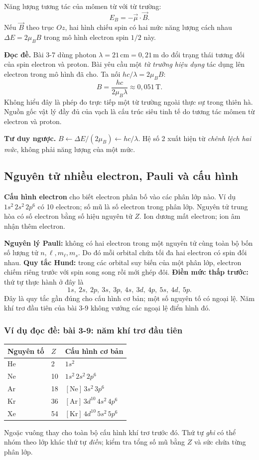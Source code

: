 \documentclass[11pt,a4paper]{article}
\newcommand{\unit}[1]{\,\mathrm{#1}}
\newcommand{\readit}[1]{\par\textbf{Đọc đề.} #1\par}
\newcommand{\think}[1]{\par\textbf{Tư duy ngược.} #1\par}
\newcommand{\ex}[1]{\subsubsection*{Ví dụ đọc đề: #1}}
\begin{document}
Năng lượng tương tác của mômen từ với từ trường:
\[
E_B=-\vec\mu\cdot\vec B.
\]
Nếu $\vec B$ theo trục $Oz$, hai hình chiếu spin có hai mức năng lượng
cách nhau $\Delta E=2\mu_BB$ trong mô hình electron spin $1/2$ này.

\readit{Bài 3-7 dùng photon $\lambda=21\unit{cm}=0{,}21\unit m$
do đổi trạng thái tương đối của spin electron và proton.
Bài yêu cầu một \emph{từ trường hiệu dụng} tác dụng lên electron trong
mô hình đã cho. Ta nối $hc/\lambda=2\mu_BB$:
\[
B=\frac{hc}{2\mu_B\lambda}\approx0{,}051\unit T.
\]
Không hiểu đây là phép đo trực tiếp một từ trường ngoài thực sự trong thiên hà.
Nguồn gốc vật lý đầy đủ của vạch là cấu trúc siêu tinh tế do tương tác
mômen từ electron và proton.}

\think{$B\leftarrow\Delta E/(2\mu_B)\leftarrow hc/\lambda$.
Hệ số 2 xuất hiện từ \emph{chênh lệch hai mức}, không phải năng lượng của một mức.}

\subsection{Nguyên tử nhiều electron, Pauli và cấu hình}\label{sec:configuration}
\textbf{Cấu hình electron} cho biết electron phân bố vào các phân lớp nào.
Ví dụ $1s^2\,2s^2\,2p^6$ có 10 electron; số mũ là số electron trong phân lớp.
Nguyên tử trung hòa có số electron bằng số hiệu nguyên tử $Z$.
Ion dương mất electron; ion âm nhận thêm electron.

\textbf{Nguyên lý Pauli:} không có hai electron trong một nguyên tử cùng
toàn bộ bốn số lượng tử $n,\ell,m_\ell,m_s$.
Do đó mỗi orbital chứa tối đa hai electron có spin đối nhau.
\textbf{Quy tắc Hund:} trong các orbital suy biến của một phân lớp,
electron chiếm riêng trước với spin song song rồi mới ghép đôi.
\textbf{Điền mức thấp trước:} thứ tự thực hành ở đây là
\[
1s,\ 2s,\ 2p,\ 3s,\ 3p,\ 4s,\ 3d,\ 4p,\ 5s,\ 4d,\ 5p.
\]
Đây là quy tắc gần đúng cho cấu hình cơ bản; một số nguyên tố có ngoại lệ.
Năm khí trơ đầu tiên của bài 3-9 không vướng các ngoại lệ điển hình đó.

\ex{bài 3-9: năm khí trơ đầu tiên}
\begin{tabularx}{\textwidth}{@{}Q{2.4cm}Q{1.2cm}Y@{}}
\toprule
\textbf{Nguyên tố} & $Z$ & \textbf{Cấu hình cơ bản}\\\midrule
He & 2 & $1s^2$\\
Ne & 10 & $1s^2\,2s^2\,2p^6$\\
Ar & 18 & $[\mathrm{Ne}]\,3s^2\,3p^6$\\
Kr & 36 & $[\mathrm{Ar}]\,3d^{10}\,4s^2\,4p^6$\\
Xe & 54 & $[\mathrm{Kr}]\,4d^{10}\,5s^2\,5p^6$\\
\bottomrule
\end{tabularx}
Ngoặc vuông thay cho toàn bộ cấu hình khí trơ trước đó.
Thứ tự \emph{ghi} có thể nhóm theo lớp khác thứ tự \emph{điền};
kiểm tra tổng số mũ bằng $Z$ và sức chứa từng phân lớp.
\end{document}

